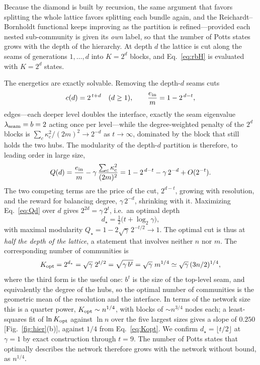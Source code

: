 \documentclass[preprint,12pt]{elsarticle}
\begin{document}
Because the diamond is built by recursion, the same argument that favors
splitting the whole lattice favors splitting each bundle again, and the
Reichardt--Bornholdt functional keeps improving as the partition is
refined---provided each nested sub-community is given its \emph{own} label, so
that the number of Potts states grows with the depth of the hierarchy. At depth
$d$ the lattice is cut along the seams of generations $1,\dots,d$ into $K=2^{d}$
blocks, and Eq.~\eqref{eq:rbH} is evaluated with $K=2^d$ states.

The energetics are exactly solvable. Removing the depth-$d$ seams cuts
\begin{equation}
  c(d) = 2^{\,t+d}\quad(d\ge1),\qquad
  \frac{e_{\rm in}}{m}=1-2^{\,d-t},
  \label{eq:cutd}
\end{equation}
edges---each deeper level doubles the interface, exactly the seam eigenvalue
$\lambda_{\rm seam}=b=2$ acting once per level---while the degree-weighted
penalty of the $2^d$ blocks is $\sum_c\kappa_c^2/(2m)^2\to2^{-d}$ as
$t\to\infty$, dominated by the block that still holds the two hubs. The
modularity of the depth-$d$ partition is therefore, to leading order in large
size,
\begin{equation}
  Q(d) = \frac{e_{\rm in}}{m}-\gamma\,\frac{\sum_c\kappa_c^2}{(2m)^2}
       = 1 - 2^{\,d-t} - \gamma\,2^{-d} + O(2^{-t}).
  \label{eq:Qd}
\end{equation}
The two competing terms are the price of the cut, $2^{d-t}$, growing with
resolution, and the reward for balancing degree, $\gamma\,2^{-d}$, shrinking
with it. Maximizing Eq.~\eqref{eq:Qd} over $d$ gives $2^{2d}=\gamma\,2^{t}$,
i.e.\ an optimal depth
\begin{equation}
  d_\star = \tfrac12\big(t+\log_2\gamma\big),
  \label{eq:dstar}
\end{equation}
with maximal modularity $Q_\star = 1 - 2\sqrt{\gamma}\,2^{-t/2}\to1$. The
optimal cut is thus at \emph{half the depth of the lattice}, a statement that
involves neither $n$ nor $m$. The corresponding number of
communities is
\begin{equation}
  K_{\rm opt}=2^{d_\star}=\sqrt{\gamma}\;2^{t/2}
             =\sqrt{\gamma\,b^{t}}
             =\sqrt{\gamma}\;m^{1/4}
             \simeq\sqrt{\gamma}\,(3n/2)^{1/4},
  \label{eq:Kopt}
\end{equation}
where the third form is the useful one: $b^t$ is the size of the top-level
seam, and equivalently the degree of the hubs, so the optimal number of
communities is the geometric mean of the resolution and the interface. In terms
of the network size this is a quarter power, $K_{\rm opt}\sim n^{1/4}$, with
blocks of $\sim n^{3/4}$ nodes each; a least-squares fit of $\ln K_{\rm opt}$
against $\ln n$ over the five largest sizes gives a slope of $0.250$
[Fig.~\ref{fig:hier}(b)], against $1/4$ from Eq.~\eqref{eq:Kopt}. We confirm
$d_\star=\lfloor t/2\rfloor$ at $\gamma=1$ by exact construction through $t=9$.
The number of Potts states that optimally describes the network therefore grows
with the network without bound, as $n^{1/4}$.
\end{document}
